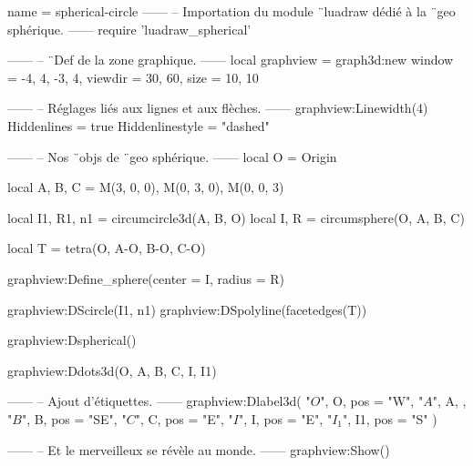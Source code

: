 \documentclass{standalone}
\begin{document}
\begin{luadraw}{name = spherical-circle}
------
-- Importation du module ¨luadraw dédié à la ¨geo sphérique.
------
require 'luadraw_spherical'

------
-- ¨Def de la zone graphique.
------
local graphview = graph3d:new{
  window  = {-4, 4, -3, 4},
  viewdir = {30, 60},
  size    = {10, 10}
}

------
-- Réglages liés aux lignes et aux flèches.
------
graphview:Linewidth(4)
Hiddenlines     = true
Hiddenlinestyle = "dashed"

------
-- Nos ¨objs de ¨geo sphérique.
------
local O = Origin

local A, B, C = M(3, 0, 0), M(0, 3, 0), M(0, 0, 3)

local I1, R1, n1 = circumcircle3d(A, B, O)
local I, R       = circumsphere(O, A, B, C)

local T = tetra(O, A-O, B-O, C-O)

graphview:Define_sphere({center = I, radius = R})

graphview:DScircle({I1, n1})
graphview:DSpolyline(facetedges(T))

graphview:Dspherical()

graphview:Ddots3d({O, A, B, C, I, I1})

------
-- Ajout d'étiquettes.
------
graphview:Dlabel3d(
  "$O$", O, {pos = "W"},
  "$A$", A, {},
  "$B$", B, {pos = "SE"},
  "$C$", C, {pos = "E"},
  "$I$", I, {pos = "E"},
  "$I_1$", I1, {pos = "S"}
)

------
-- Et le merveilleux se révèle au monde.
------
graphview:Show()
\end{luadraw}
\end{document}
